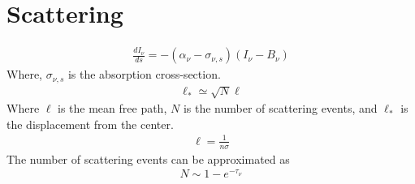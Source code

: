 \section{Scattering}

    \begin{align}
        \frac{dI_{\nu}}{ds} = -(\alpha_{\nu} - \sigma_{\nu,s}) (I_{\nu} - B_{\nu})
    \end{align}
    Where, $\sigma_{\nu,s}$ is the absorption cross-section.
    \begin{align}
        \ell_{*} \simeq \sqrt{N}\ell
    \end{align}
    Where $\ell$ is the mean free path, $N$ is the number of scattering events, and $\ell_{*}$ is the displacement from the center.
    \begin{align}
        \ell = \frac{1}{n\sigma}
    \end{align}
    The number of scattering events can be approximated as
    \begin{align}
        N \sim 1 - e^{-\tau_{\nu}}
    \end{align}

